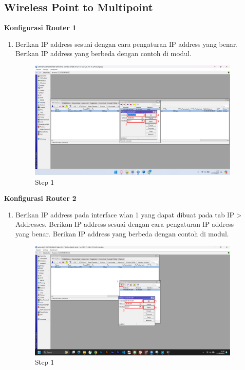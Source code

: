 \subsection{Wireless Point to Multipoint}
\begin{center}

	\textbf{Konfigurasi Router 1}
	\begin{enumerate}
		\item Berikan IP address sesuai dengan cara pengaturan IP address yang benar. Berikan IP address yang berbeda dengan contoh di modul.
		      \begin{figure}[H]
			      \centering
			      \includegraphics[width=0.9\linewidth]{P1/img/per1/pc1/Step 2.2.png}
			      \caption{Step 1}
			      \label{fig:Step 1(Per.2 PC1)}
		      \end{figure}
	\end{enumerate}

	\textbf{Konfigurasi Router 2}
	\begin{enumerate}
		\item Berikan IP address pada interface wlan 1 yang dapat dibuat pada tab IP > Addresses. Berikan IP address sesuai dengan cara pengaturan IP address yang benar. Berikan IP address yang berbeda dengan contoh di modul.
		      \begin{figure}[H]
			      \centering
			      \includegraphics[width=0.9\linewidth]{P1/img/per1/pc2/Step 2.png}
			      \caption{Step 1}
			      \label{fig:Step 1(Per.2 PC2)}
		      \end{figure}
	\end{enumerate}


\end{center}
